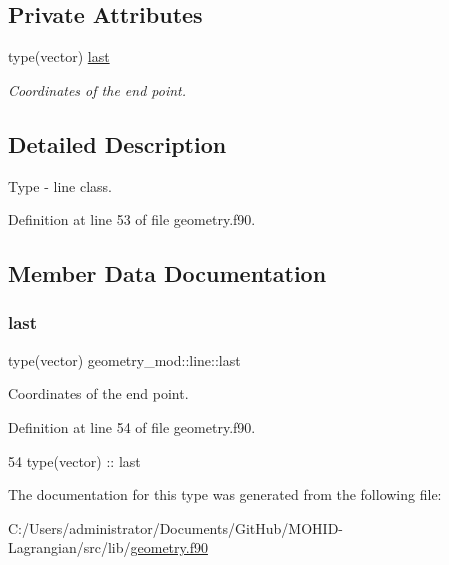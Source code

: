 \subsection*{Private Attributes}
\begin{DoxyCompactItemize}
\item 
type(vector) \mbox{\hyperlink{structgeometry__mod_1_1line_a1f7c879c60698c2f903f5258ad6f446c}{last}}
\begin{DoxyCompactList}\small\item\em Coordinates of the end point. \end{DoxyCompactList}\end{DoxyCompactItemize}


\subsection{Detailed Description}
Type -\/ line class. 

Definition at line 53 of file geometry.\+f90.



\subsection{Member Data Documentation}
\mbox{\label{structgeometry__mod_1_1line_a1f7c879c60698c2f903f5258ad6f446c}} 
\subsubsection{\texorpdfstring{last}{last}}
{\footnotesize\ttfamily type(vector) geometry\+\_\+mod\+::line\+::last\hspace{0.3cm}{\ttfamily [private]}}



Coordinates of the end point. 



Definition at line 54 of file geometry.\+f90.


\begin{DoxyCode}
54         \textcolor{keywordtype}{type}(vector) :: last
\end{DoxyCode}


The documentation for this type was generated from the following file\+:\begin{DoxyCompactItemize}
\item 
C\+:/\+Users/administrator/\+Documents/\+Git\+Hub/\+M\+O\+H\+I\+D-\/\+Lagrangian/src/lib/\mbox{\hyperlink{geometry_8f90}{geometry.\+f90}}\end{DoxyCompactItemize}
